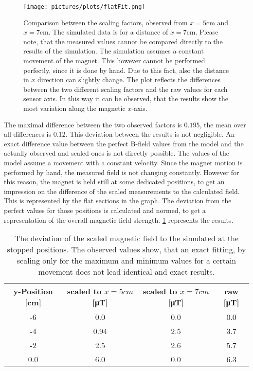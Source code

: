 \begin{figure}[h]
\texttt{[image: pictures/plots/flatFit.png]}
\caption{Comparison between the scaling factors, observed from $ x=5\si{\cm} $ and $ x=7\si{\cm} $. The simulated data is for a distance of $ x=7\si{\cm} $. Please note, that the measured values cannot be compared directly to the results of the simulation. The simulation assumes a constant movement of the magnet. This however cannot be performed perfectly, since it is done by hand. Due to this fact, also the distance in $ x $ direction can slightly change. The plot reflects the differences between the two different scaling factors and the raw values for each sensor axis. In this way it can be observed, that the results show the most variation along the magnetic $ x $-axis. }
\label{fig:flatFit}
\end{figure}

The maximal difference between the two observed factors is $ 0.195 $, the mean over all differences is $ 0.12 $. This deviation between the results is not negligible. An exact difference value between the perfect B-field values from the model and the actually observed and scaled ones is not directly possible. The values of the model assume a movement with a constant velocity. Since the magnet motion is performed by hand, the measured field is not changing constantly. However for this reason, the magnet is held still at some dedicated positions, to get an impression on the difference of the scaled measurements to the calculated field. This is represented by the flat sections in the graph. The deviation from the perfect values for those positions is calculated and normed, to get a representation of the overall magnetic field strength. \ref{tab:diffScaled} represents the results.
\begin{table}[h!]
\centering
\begin{tabular}{|c|c|c|c|}
\hline
y-Position [\si{cm}] & scaled to $ x=5\si{cm} $ [\si{\micro \tesla}] & scaled to $ x=7\si{cm} $ [\si{\micro \tesla}] & raw [\si{\micro \tesla}] \\ \hline
-6    & 0.0  &  0.0  & 0.0 	\\ \hline
-4    &	0.94 &  2.5  & 3.7 	\\ \hline
-2    &	2.5  &  2.6  & 5.7 	\\ \hline
0.0	  &	6.0  &  0.0  & 6.3 	\\ \hline
\end{tabular}
\caption{The deviation of the scaled magnetic field to the simulated at the stopped positions. The observed values show, that an exact fitting, by scaling only for the maximum and minimum values for a certain movement does not lead identical and exact results.}
\label{tab:diffScaled}
\end{table}


